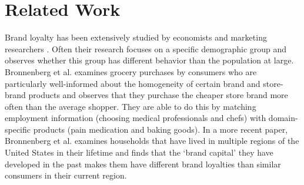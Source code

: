 \documentclass[conference]{IEEEtran}
\begin{document}
%




\section{Related Work}
Brand loyalty has been extensively studied by economists and marketing researchers\cite{KAMAKURA19939} \cite{bronnenberg2016formation}. Often their research focuses on a specific demographic group and observes whether this group has different behavior than the population at large. Bronnenberg et al.\cite{bronnenberg2014pharmacists} examines grocery purchases by consumers who are particularly well-informed about the homogeneity of certain brand and store-brand products and observes that they purchase the cheaper store brand more often than the average shopper. They are able to do this by matching employment information (choosing medical professionals and chefs) with domain-specific products (pain medication and baking goods). In a more recent paper, Bronnenberg et al.\cite{bronnenberg2012evolution} examines households that have lived in multiple regions of the United States in their lifetime and finds that the `brand capital' they have developed in the past makes them have different brand loyalties than similar consumers in their current region.
\end{document}
